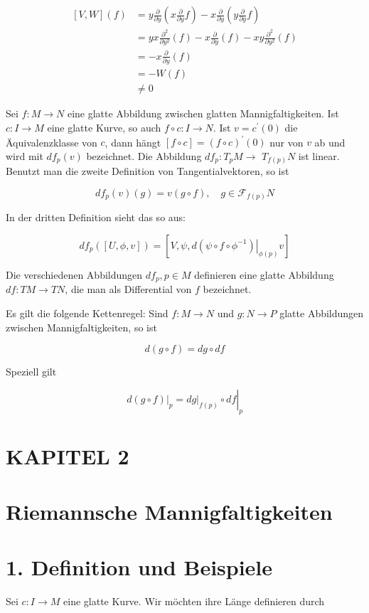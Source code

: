 \documentclass[10pt, letterpaper]{article}
\begin{document}
$$
\begin{aligned}
{[V, W](f) } & =y \frac{\partial}{\partial y}\left(x \frac{\partial}{\partial y} f\right)-x \frac{\partial}{\partial y}\left(y \frac{\partial}{\partial y} f\right) \\
& =y x \frac{\partial^{2}}{\partial y^{2}}(f)-x \frac{\partial}{\partial y}(f)-x y \frac{\partial^{2}}{\partial y^{2}}(f) \\
& =-x \frac{\partial}{\partial y}(f) \\
& =-W(f) \\
& \neq 0
\end{aligned}
$$

Sei $f: M \rightarrow N$ eine glatte Abbildung zwischen glatten Mannigfaltigkeiten. Ist $c: I \rightarrow M$ eine glatte Kurve, so auch $f \circ c: I \rightarrow N$. Ist $v=c^{\prime}(0)$ die Äquivalenzklasse von $c$, dann hängt $[f \circ c]=(f \circ c)^{\prime}(0)$ nur von $v$ ab und wird mit $d f_{p}(v)$ bezeichnet. Die Abbildung $d f_{p}: T_{p} M \rightarrow$ $T_{f(p)} N$ ist linear. Benutzt man die zweite Definition von Tangentialvektoren, so ist

$$
d f_{p}(v)(g)=v(g \circ f), \quad g \in \mathcal{F}_{f(p)} N
$$

In der dritten Definition sieht das so aus:

$$
d f_{p}([U, \phi, v])=\left[V, \psi,\left.d\left(\psi \circ f \circ \phi^{-1}\right)\right|_{\phi(p)} v\right]
$$

Die verschiedenen Abbildungen $d f_{p}, p \in M$ definieren eine glatte Abbildung $d f: T M \rightarrow T N$, die man als Differential von $f$ bezeichnet.

Es gilt die folgende Kettenregel: Sind $f: M \rightarrow N$ und $g: N \rightarrow P$ glatte Abbildungen zwischen Mannigfaltigkeiten, so ist

$$
d(g \circ f)=d g \circ d f
$$

Speziell gilt

$$
\left.d(g \circ f)\right|_{p}=\left.\left.d g\right|_{f(p)} \circ d f\right|_{p}
$$

\section*{KAPITEL 2}
\section*{Riemannsche Mannigfaltigkeiten}
\section*{1. Definition und Beispiele}
Sei $c: I \rightarrow M$ eine glatte Kurve. Wir möchten ihre Länge definieren durch
\end{document}
